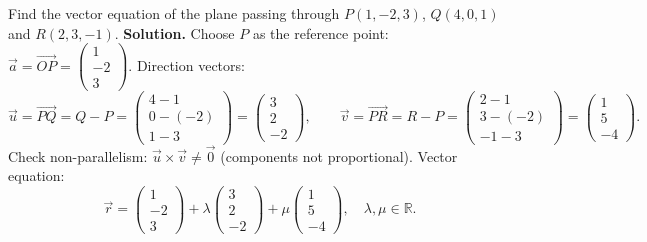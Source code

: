 \documentclass[11pt]{article}
\begin{document}
\begin{exoresolu}
Find the vector equation of the plane passing through $P(1,-2,3)$, $Q(4,0,1)$ and $R(2,3,-1)$.
\tcblower
\textbf{Solution.}
Choose $P$ as the reference point: $\vec{a}=\overrightarrow{OP}=\begin{pmatrix}1\\-2\\3\end{pmatrix}$.
Direction vectors:
\[
\vec{u}=\overrightarrow{PQ}=Q-P=\begin{pmatrix}4-1\\0-(-2)\\1-3\end{pmatrix}=\begin{pmatrix}3\\2\\-2\end{pmatrix},
\qquad
\vec{v}=\overrightarrow{PR}=R-P=\begin{pmatrix}2-1\\3-(-2)\\-1-3\end{pmatrix}=\begin{pmatrix}1\\5\\-4\end{pmatrix}.
\]
Check non-parallelism: $\vec{u}\times\vec{v}\neq\vec{0}$ (components not proportional).
Vector equation:
\[
\vec{r}=\begin{pmatrix}1\\-2\\3\end{pmatrix}+\lambda\begin{pmatrix}3\\2\\-2\end{pmatrix}+\mu\begin{pmatrix}1\\5\\-4\end{pmatrix},\quad \lambda,\mu\in\mathbb{R}.
\]
\end{exoresolu}
\end{document}
